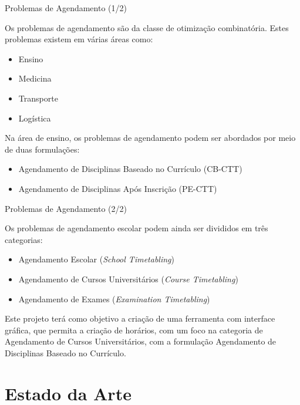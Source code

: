\documentclass[aspectratio=169]{beamer}
\begin{document}
    \begin{frame}{Problemas de Agendamento (1/2)}
        \justifying

        Os problemas de agendamento são da classe de otimização combinatória. Estes problemas existem em várias áreas como:
        \begin{itemize}
            \item Ensino
            \item Medicina
            \item Transporte
            \item Logística
        \end{itemize}
        \vfill

        Na área de ensino, os problemas de agendamento podem ser abordados por meio de duas formulações:
        \begin{itemize}
            \item Agendamento de Disciplinas Baseado no Currículo (CB-CTT)
            \item Agendamento de Disciplinas Após Inscrição (PE-CTT)
        \end{itemize}

        \vfill
    \end{frame}

    \begin{frame}{Problemas de Agendamento (2/2)}
        \justifying

        Os problemas de agendamento escolar podem ainda ser divididos em três categorias:
        \begin{itemize}
            \item Agendamento Escolar (\textit{School Timetabling})
            \item Agendamento de Cursos Universitários (\textit{Course Timetabling})
            \item Agendamento de Exames (\textit{Examination Timetabling})
        \end{itemize}
        
        \vfill

        Este projeto terá como objetivo a criação de uma ferramenta com interface gráfica, que permita a criação de horários, com um foco na categoria de Agendamento de Cursos Universitários, com a formulação Agendamento de Disciplinas Baseado no Currículo.
    \end{frame}

    \section{Estado da Arte}
\end{document}
